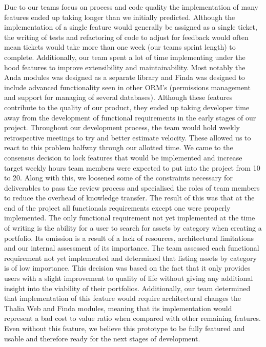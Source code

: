 \documentclass[main.tex]{subfiles}
\begin{document}
Due to our teams focus on process and code quality the implementation of many features ended up taking longer than we initially predicted. Although the implementation of a single feature would generally be assigned as a single ticket, the writing of tests and refactoring of code to adjust for feedback would often mean tickets would take more than one week (our teams sprint length) to complete. Additionally, our team spent a lot of time implementing under the hood features to improve extensibility and maintainability. Most notably the Anda modules was designed as a separate library and Finda was designed to include advanced functionality seen in other ORM’s (permissions management and support for managing of several databases). Although these features contribute to the quality of our product, they ended up taking developer time away from the development of functional requirements in the early stages of our project.
Throughout our development process, the team would hold weekly retrospective meetings to try and better estimate velocity. These allowed us to react to this problem halfway through our allotted time. We came to the consensus decision to lock features that would be implemented and increase target weekly hours team members were expected to put into the project from 10 to 20. Along with this, we loosened some of the constraints necessary for deliverables to pass the review process and specialised the roles of team members to reduce the overhead of knowledge transfer. The result of this was that at the end of the project all functionals requirements except one were properly implemented.
The only functional requirement not yet implemented at the time of writing is the ability for a user to search for assets by category when creating a portfolio. Its omission is a result of a lack of resources, architectural limitations and our internal assessment of its importance. The team assessed each functional requirement not yet implemented and determined that listing assets by category is of low importance. This decision was based on the fact that it only provides users with a slight improvement to quality of life without giving any additional insight into the viability of their portfolios. Additionally, our team determined that implementation of this feature would require architectural changes the Thalia Web and Finda modules, meaning that its implementation would represent a bad cost to value ratio when compared with other remaining features. 
Even without this feature, we believe this prototype to be fully featured and usable and therefore ready for the next stages of development.
\end{document}
